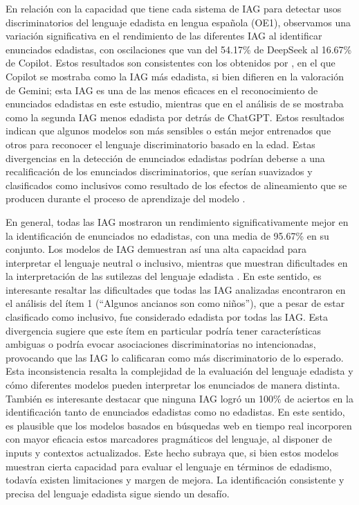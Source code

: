 \documentclass[spanish]{textolivre}
\begin{document}
En relación con la capacidad que tiene cada sistema de IAG para detectar usos discriminatorios del lenguaje edadista en lengua española (OE1), observamos una variación significativa en el rendimiento de las diferentes IAG al identificar enunciados edadistas, con oscilaciones que van del 54.17\% de DeepSeek al 16.67\% de Copilot. Estos resultados son consistentes con los obtenidos por \textcite{arandarubio2024}, en el que Copilot se mostraba como la IAG más edadista, si bien difieren en la valoración de Gemini; esta IAG es una de las menos eficaces en el reconocimiento de enunciados edadistas en este estudio, mientras que en el análisis de \textcite{arandarubio2024} se mostraba como la segunda IAG menos edadista por detrás de ChatGPT. Estos resultados indican que algunos modelos son más sensibles o están mejor entrenados que otros para reconocer el lenguaje discriminatorio basado en la edad. Estas divergencias en la detección de enunciados edadistas podrían deberse a una recalificación de los enunciados discriminatorios, que serían suavizados y clasificados como inclusivos como resultado de los efectos de alineamiento que se producen durante el proceso de aprendizaje del modelo \cite{rogers2025}.

En general, todas las IAG mostraron un rendimiento significativamente mejor en la identificación de enunciados no edadistas, con una media de 95.67\% en su conjunto. Los modelos de IAG demuestran así una alta capacidad para interpretar el lenguaje neutral o inclusivo, mientras que muestran dificultades en la interpretación de las sutilezas del lenguaje edadista \cite{gomezcamacho2025}. En este sentido, es interesante resaltar las dificultades que todas las IAG analizadas encontraron en el análisis del ítem 1 (``Algunos ancianos son como niños''), que a pesar de estar clasificado como inclusivo, fue considerado edadista por todas las IAG. Esta divergencia sugiere que este ítem en particular podría tener características ambiguas o podría evocar asociaciones discriminatorias no intencionadas, provocando que las IAG lo calificaran como más discriminatorio de lo esperado. Esta inconsistencia resalta la complejidad de la evaluación del lenguaje edadista y cómo diferentes modelos pueden interpretar los enunciados de manera distinta. También es interesante destacar que ninguna IAG logró un 100\% de aciertos en la identificación tanto de enunciados edadistas como no edadistas. En este sentido, es plausible que los modelos basados en búsquedas web en tiempo real incorporen con mayor eficacia estos marcadores pragmáticos del lenguaje, al disponer de inputs y contextos actualizados. Este hecho subraya que, si bien estos modelos muestran cierta capacidad para evaluar el lenguaje en términos de edadismo, todavía existen limitaciones y margen de mejora. La identificación consistente y precisa del lenguaje edadista sigue siendo un desafío.
\end{document}
